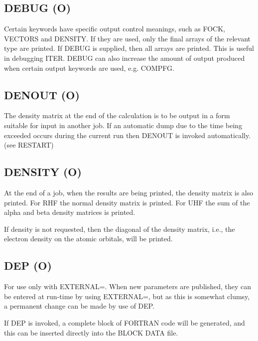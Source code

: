 \documentclass[a4paper]{book}
\newcommand{\mi}[1]{#1\index{#1}}
\begin{document}
                                   
\subsection*{DEBUG (O)}
        Certain keywords have specific  output  control  meanings,  such  as
   FOCK,  VECTORS  and  DENSITY.  If they are used, only the final arrays of
   the relevant type are printed.  If DEBUG is supplied, then all arrays are
   printed.   This is useful in debugging ITER.  
   \mi{DEBUG} can also increase the
   amount of output produced when certain output  keywords  are  used,  e.g.
   COMPFG.


                                  
\subsection*{DENOUT (O)}
        The density matrix at the end of the calculation is to be output  in
   a  form  suitable  for input in another job.  If an automatic dump due to
   the time being exceeded occurs during the  current  run  then  DENOUT  is
   invoked automatically.  (see RESTART)


                                  
\subsection*{DENSITY (O)}
        At the end of a job, when the results are being printed, the density
   matrix  is  also  printed.  For RHF the normal density matrix is printed.
   For UHF the sum of the alpha and beta density matrices is printed.

        If density is not  requested,  then  the  diagonal  of  the  density
   matrix,  i.e.,  the  electron  density  on  the  atomic orbitals, will be
   printed.


\subsection*{DEP (O)}
      For use only with EXTERNAL=.  When  new  parameters  are  published,
 they  can  be  entered  at  run-time  by  using EXTERNAL=, but as this is
 somewhat clumsy, a permanent change can be made by use of DEP.

      If DEP is  invoked,  a  complete  block  of  FORTRAN  code  will  be
 generated, and this can be inserted directly into the BLOCK DATA file.
 
\end{document}
